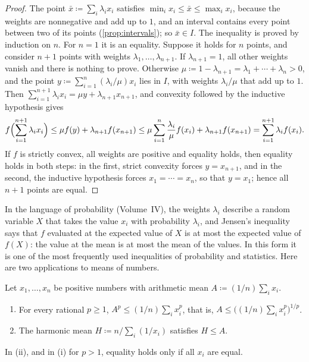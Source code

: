 \begin{proof}
The point $\bar x\coloneqq\sum_i\lambda_ix_i$ satisfies $\min_ix_i\le\bar x\le\max_ix_i$, because the weights are nonnegative and add up to $1$, and an interval contains every point between two of its points (\cref{prop:intervals}); so $\bar x\in I$. The inequality is proved by induction on $n$. For $n=1$ it is an equality. Suppose it holds for $n$ points, and consider $n+1$ points with weights $\lambda_1,\ldots,\lambda_{n+1}$. If $\lambda_{n+1}=1$, all other weights vanish and there is nothing to prove. Otherwise $\mu\coloneqq1-\lambda_{n+1}=\lambda_1+\cdots+\lambda_n>0$, and the point $y\coloneqq\sum_{i=1}^n(\lambda_i/\mu)x_i$ lies in $I$, with weights $\lambda_i/\mu$ that add up to $1$. Then $\sum_{i=1}^{n+1}\lambda_ix_i=\mu y+\lambda_{n+1}x_{n+1}$, and convexity followed by the inductive hypothesis gives
\[
f\Bigl(\sum_{i=1}^{n+1}\lambda_ix_i\Bigr)\le\mu f(y)+\lambda_{n+1}f(x_{n+1})\le\mu\sum_{i=1}^n\frac{\lambda_i}\mu f(x_i)+\lambda_{n+1}f(x_{n+1})=\sum_{i=1}^{n+1}\lambda_if(x_i).
\]
If $f$ is strictly convex, all weights are positive and equality holds, then equality holds in both steps: in the first, strict convexity forces $y=x_{n+1}$, and in the second, the inductive hypothesis forces $x_1=\cdots=x_n$, so that $y=x_1$; hence all $n+1$ points are equal.
\end{proof}

In the language of probability (Volume~IV), the weights $\lambda_i$ describe a random variable $X$ that takes the value $x_i$ with probability $\lambda_i$, and Jensen's inequality says that $f$ evaluated at the expected value of $X$ is at most the expected value of $f(X)$: the value at the mean is at most the mean of the values. In this form it is one of the most frequently used inequalities of probability and statistics. Here are two applications to means of numbers.

\begin{corollary}
\label{cor:power-means}
Let $x_1,\ldots,x_n$ be positive numbers with arithmetic mean $A\coloneqq(1/n)\sum_ix_i$.
\begin{enumerate}
\item For every rational $p\ge1$, $A^p\le(1/n)\sum_ix_i^p$, that is, $A\le\bigl((1/n)\sum_ix_i^p\bigr)^{1/p}$.
\item The harmonic mean $H\coloneqq n\big/\sum_i(1/x_i)$ satisfies $H\le A$.
\end{enumerate}
In (ii), and in (i) for $p>1$, equality holds only if all $x_i$ are equal.
\end{corollary}

